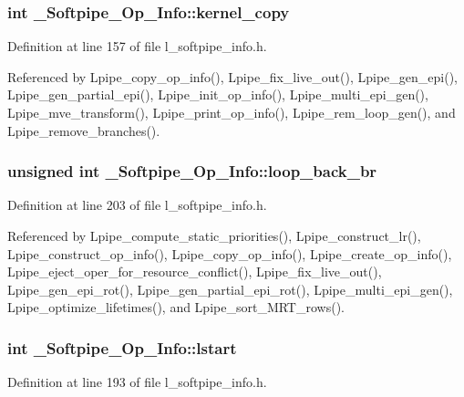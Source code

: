 \subsubsection{\setlength{\rightskip}{0pt plus 5cm}int \bf{\_\-Softpipe\_\-Op\_\-Info::kernel\_\-copy}}\label{struct__Softpipe__Op__Info_3fadf4a8a69a2dad970274041fed7e69}




Definition at line 157 of file l\_\-softpipe\_\-info.h.

Referenced by Lpipe\_\-copy\_\-op\_\-info(), Lpipe\_\-fix\_\-live\_\-out(), Lpipe\_\-gen\_\-epi(), Lpipe\_\-gen\_\-partial\_\-epi(), Lpipe\_\-init\_\-op\_\-info(), Lpipe\_\-multi\_\-epi\_\-gen(), Lpipe\_\-mve\_\-transform(), Lpipe\_\-print\_\-op\_\-info(), Lpipe\_\-rem\_\-loop\_\-gen(), and Lpipe\_\-remove\_\-branches().
\subsubsection{\setlength{\rightskip}{0pt plus 5cm}unsigned int \bf{\_\-Softpipe\_\-Op\_\-Info::loop\_\-back\_\-br}}\label{struct__Softpipe__Op__Info_034c9bb438f63aa517f1ab2fc1a6a66b}




Definition at line 203 of file l\_\-softpipe\_\-info.h.

Referenced by Lpipe\_\-compute\_\-static\_\-priorities(), Lpipe\_\-construct\_\-lr(), Lpipe\_\-construct\_\-op\_\-info(), Lpipe\_\-copy\_\-op\_\-info(), Lpipe\_\-create\_\-op\_\-info(), Lpipe\_\-eject\_\-oper\_\-for\_\-resource\_\-conflict(), Lpipe\_\-fix\_\-live\_\-out(), Lpipe\_\-gen\_\-epi\_\-rot(), Lpipe\_\-gen\_\-partial\_\-epi\_\-rot(), Lpipe\_\-multi\_\-epi\_\-gen(), Lpipe\_\-optimize\_\-lifetimes(), and Lpipe\_\-sort\_\-MRT\_\-rows().
\subsubsection{\setlength{\rightskip}{0pt plus 5cm}int \bf{\_\-Softpipe\_\-Op\_\-Info::lstart}}\label{struct__Softpipe__Op__Info_2ff128cfe3a8287ec7b981c8259b7c55}




Definition at line 193 of file l\_\-softpipe\_\-info.h.

